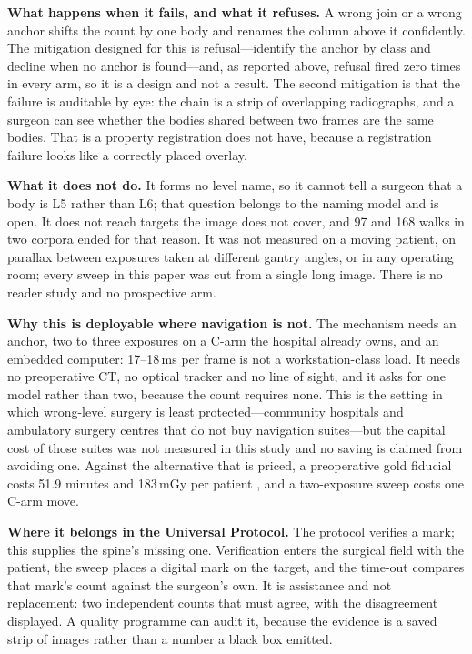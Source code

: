 \documentclass[11pt,letterpaper]{article}
\begin{document}
\noindent\textbf{What happens when it fails, and what it refuses.} A wrong join or a wrong anchor shifts the
count by one body and renames the column above it confidently. The mitigation designed for this is
refusal---identify the anchor by class and decline when no anchor is found---and, as reported above, refusal
fired zero times in every arm, so it is a design and not a result. The second mitigation is that the failure
is auditable by eye: the chain is a strip of overlapping radiographs, and a surgeon can see whether the
bodies shared between two frames are the same bodies. That is a property registration does not have, because
a registration failure looks like a correctly placed overlay.

\noindent\textbf{What it does not do.} It forms no level name, so it cannot tell a surgeon that a body is L5
rather than L6; that question belongs to the naming model and is open. It does not reach targets the image
does not cover, and 97 and 168 walks in two corpora ended for that reason. It was not measured on a moving
patient, on parallax between exposures taken at different gantry angles, or in any operating room; every
sweep in this paper was cut from a single long image. There is no reader study and no prospective arm.

\noindent\textbf{Why this is deployable where navigation is not.} The mechanism needs an anchor, two to
three exposures on a C-arm the hospital already owns, and an embedded computer: 17--18\,ms per frame is not a
workstation-class load. It needs no preoperative CT, no optical tracker and no line of sight, and it asks for
one model rather than two, because the count requires none. This is the setting in which wrong-level surgery
is least protected---community hospitals and ambulatory surgery centres that do not buy navigation
suites---but the capital cost of those suites was not measured in this study and no saving is claimed from
avoiding one. Against the alternative that is priced, a preoperative gold fiducial costs 51.9 minutes and
183\,mGy per patient \citep{siminski2023}, and a two-exposure sweep costs one C-arm move.

\noindent\textbf{Where it belongs in the Universal Protocol.} The protocol verifies a mark; this supplies the
spine's missing one. Verification enters the surgical field with the patient, the sweep places a digital
mark on the target, and the time-out compares that mark's count against the surgeon's own. It is assistance
and not replacement: two independent counts that must agree, with the disagreement displayed. A quality
programme can audit it, because the evidence is a saved strip of images rather than a number a black box
emitted.
\end{document}
